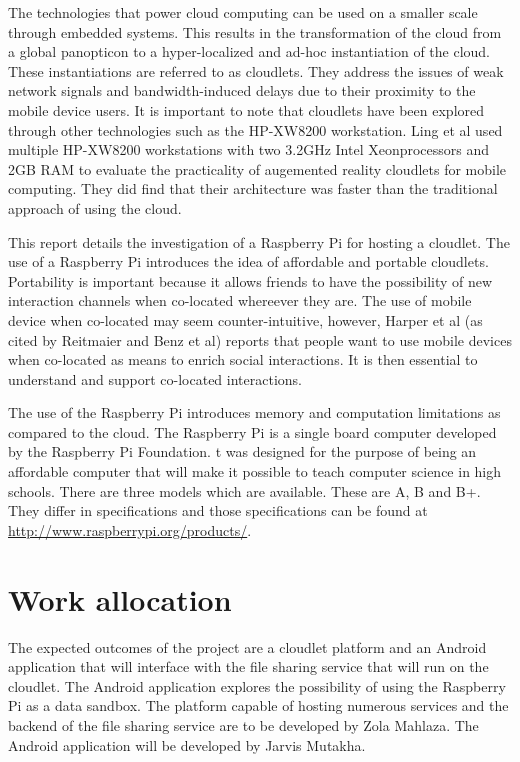 The technologies that power cloud computing can be used on a smaller scale through embedded systems. This results in the transformation of the cloud from a global panopticon to a hyper-localized and ad-hoc instantiation of the cloud. These instantiations are referred to as cloudlets. They address the issues of weak network signals and bandwidth-induced delays due to their proximity to the mobile device users. It is important to note that cloudlets have been explored through other technologies such as the HP-XW8200 workstation. Ling et al\cite{ling2011ar} used multiple HP-XW8200 workstations with two 3.2GHz Intel Xeonprocessors and 2GB RAM to evaluate the practicality of augemented reality cloudlets for mobile computing. They did find that their architecture was faster than the traditional approach of using the cloud.\newline

This report details the investigation of a Raspberry Pi for hosting a cloudlet. The use of a Raspberry Pi introduces the idea of affordable and portable cloudlets. Portability is important because it allows friends to have the possibility of new interaction channels when co-located whereever they are. The use of mobile device when co-located may seem counter-intuitive, however, Harper et al\cite{RefWorks:15} (as cited by Reitmaier and Benz et al\cite[p. 381]{reitmaier2013designing}) reports that people want to use mobile devices when co-located as means to enrich social interactions. It is then essential to understand and support co-located interactions.\newline

The use of the Raspberry Pi introduces memory and computation limitations as compared to the cloud. The Raspberry Pi is a single board computer developed by the Raspberry Pi Foundation. t was designed for the purpose of being an affordable computer that will make it possible to teach computer science in high schools. There are three models which are available. These are A, B and B+. They differ in specifications and those specifications can be found at \url{ http://www.raspberrypi.org/products/}.

\section{Work allocation}
The expected outcomes of the project are a cloudlet platform and an Android application that will interface with the file sharing service that will run on the cloudlet. The Android application explores the possibility of using the Raspberry Pi as a data sandbox. The platform capable of hosting numerous services and the backend of the file sharing service are to be developed by Zola Mahlaza. The Android application will be developed by Jarvis Mutakha.

